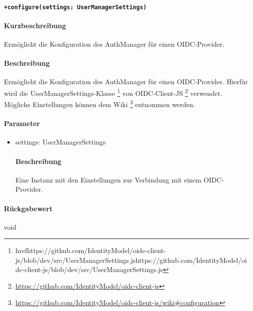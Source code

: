 \paragraph{\texttt{+configure(settings: UserManagerSettings)}}%
\paragraph*{Kurzbeschreibung}
Ermöglicht die Konfiguration des AuthManager für einen OIDC-Provider.
\paragraph*{Beschreibung}
Ermöglicht die Konfiguration des AuthManager für einen OIDC-Provider.
Hierfür wird die UserManagerSettings-Klasse \footnote{href{https://github.com/IdentityModel/oidc-client-js/blob/dev/src/UserManagerSettings.js}{https://github.com/IdentityModel/oidc-client-js/blob/dev/src/UserManagerSettings.js}} von 
OIDC-Client-JS \footnote{\href{https://github.com/IdentityModel/oidc-client-js}{https://github.com/IdentityModel/oidc-client-js}} verwendet.
Mögliche Einstellungen können dem Wiki \footnote{\href{https://github.com/IdentityModel/oidc-client-js/wiki#configuration}{https://github.com/IdentityModel/oidc-client-js/wiki#configuration}} entnommen werden.
\paragraph*{Parameter}
\begin{itemize}
    \item settings: UserManagerSettings
            \paragraph*{Beschreibung}
            Eine Instanz mit den Einstellungen zur Verbindung mit einem OIDC-Provider.
\end{itemize}
\paragraph*{Rückgabewert}
void